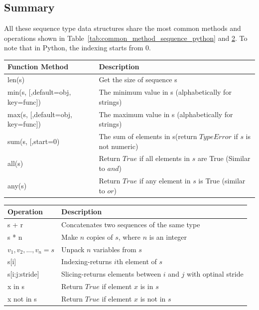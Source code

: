 \documentclass[../main.tex]{subfiles}
\begin{document}
\subsection{Summary}
All these sequence type data structures share the most common methods and operations shown in Table~\ref{tab:common_method_sequence_python} and \ref{tab:common_operation_sequence_python}. To note that in Python, the indexing starts from 0. 
\begin{table}[h]
\begin{small}
\centering
\noindent{}
 \noindent \begin{tabular}{|p{}|p{}| }
  \hline
 Function Method& Description   \\ \hline
len(s)  & Get the size of sequence s \\\hline
min(s, [,default=obj, key=func])  &The minimum value in s (alphabetically for strings)\\ \hline
max(s, [,default=obj, key=func])  &The maximum value in s (alphabetically for strings)\\ \hline
 sum(s, [,start=0)  &The sum of elements in s(return $TypeError$ if $s$ is not numeric)\\ \hline
all(s)  & Return $True$ if all elements in $s$ are True (Similar to $and$)\\ \hline
any(s)  &Return $True$ if any element in $s$ is True (similar to $or$)\\ \hline
\end{tabular}
  \label{tab:common_method_sequence_python}
\centering
\noindent{}
 \noindent \begin{tabular}{|p{}|p{}| }
  \hline
Operation & Description   \\ \hline
s + r  & Concatenates two sequences of the same type \\\hline
s * n  &Make $n$ copies of $s$, where $n$ is an integer\\ \hline
$v_1, v_2, ..., v_n = s$  &Unpack $n$ variables from $s$\\ \hline
s[i]  &Indexing-returns $i$th element of $s$\\ \hline
s[i:j:stride]  & Slicing-returns elements between $i$ and $j$ with optinal stride\\ \hline
x in s  &Return $True$ if element $x$ is in $s$\\ \hline
x not in s  &Return $True$ if element $x$ is not in $s$\\ \hline
\end{tabular}
  \label{tab:common_operation_sequence_python}
  \end{small}
\end{table}
\end{document}
